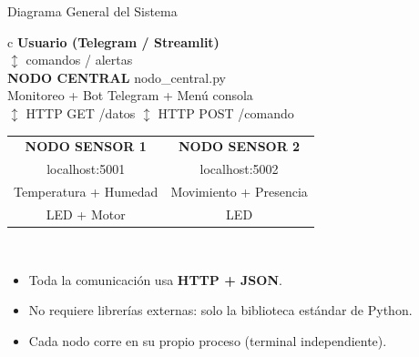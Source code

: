 \documentclass[aspectratio=169]{beamer}
\begin{document}
\begin{frame}{Diagrama General del Sistema}

\begin{center}
\ttfamily\small
\begin{tabular}{c}
\hline
\textbf{Usuario (Telegram / Streamlit)} \\
\hline
$\updownarrow$ comandos / alertas \\
\hline
\textbf{NODO CENTRAL} \quad nodo\_central.py \\
Monitoreo + Bot Telegram + Men\'u consola \\
\hline
$\updownarrow$ HTTP GET /datos \quad $\updownarrow$ HTTP POST /comando \\
\hline
\begin{tabular}{c|c}
\textbf{NODO SENSOR 1} & \textbf{NODO SENSOR 2} \\
localhost:5001 & localhost:5002 \\
Temperatura + Humedad & Movimiento + Presencia \\
LED + Motor & LED \\
\end{tabular} \\
\hline
\end{tabular}
\end{center}

\vspace{0.5em}
\begin{itemize}
  \item Toda la comunicaci\'on usa \textbf{HTTP + JSON}.
  \item No requiere librer\'ias externas: solo la biblioteca est\'andar de Python.
  \item Cada nodo corre en su propio proceso (terminal independiente).
\end{itemize}
\end{frame}
\end{document}
